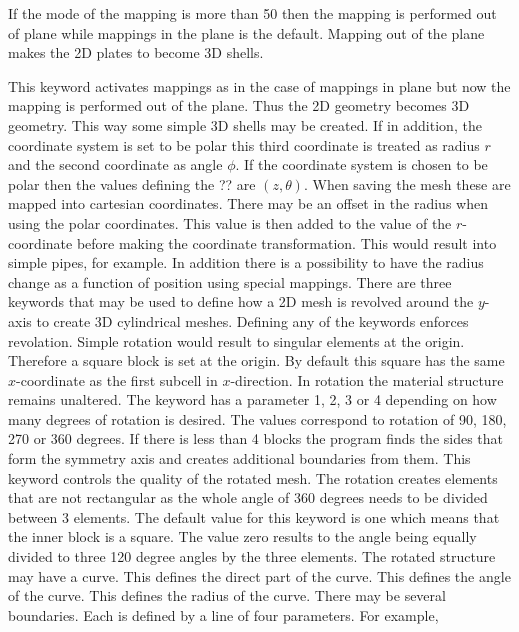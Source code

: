 If the mode of the mapping is more than 50 then 
the mapping is performed out of plane while mappings 
in the plane is the default.
Mapping out of the plane makes the 2D plates to become 3D shells.

This keyword activates mappings as in the case of mappings in plane 
but now the mapping is performed 
out of the plane. 
Thus the 2D geometry becomes 3D geometry.
This way some simple 3D shells may be created. 
If in addition, the coordinate system is set to be polar this 
third coordinate is treated as radius $r$ and the second
coordinate as angle $\phi$. 
%
If the coordinate system is chosen to be polar then 
the values defining the ?? are $(z,\theta)$.
When saving the mesh these are mapped into cartesian coordinates.
There may be an offset in the radius when using the polar coordinates.
This value is then added to the value of the $r$-coordinate before making the
coordinate transformation. This would result into simple pipes, for example.
In addition there is a possibility to have the radius change as a function
of position using special mappings.
%
There are three keywords that may be used to define how a 2D mesh is revolved
around the $y$-axis
to create 3D cylindrical meshes.
Defining any of the keywords enforces revolation.
Simple rotation would result to singular elements at the 
origin. Therefore a square block is set at the origin.
By default this square has the same $x$-coordinate as the
first subcell in $x$-direction.
In rotation the material structure remains unaltered. 
%
The keyword has a parameter 1, 2, 3 or 4 depending on 
how many degrees of rotation is desired. The values 
correspond to rotation of 90, 180, 270 or 360 degrees.
If there is less than 4
blocks the program finds the sides that form the 
symmetry axis and creates additional boundaries from them.   
%
This keyword controls the quality of the rotated mesh.
The rotation creates elements that are not rectangular as
the whole angle of 360 degrees needs to be divided between 3
elements. The default value for this keyword is one 
which means that the inner block is a square.
The value zero results to the angle being equally divided to three 
120 degree angles by the three elements.
%
The rotated structure may have a curve. This defines the 
direct part of the curve.
This defines the angle of the curve.
This defines the radius of the curve.
%
There may be several boundaries. Each is defined by a line
of four parameters.  For example,

